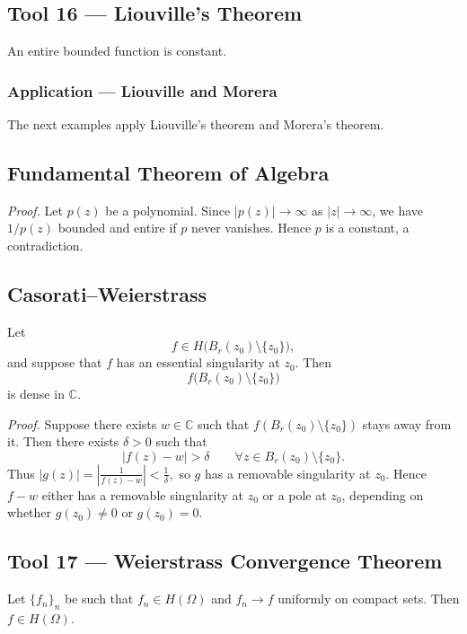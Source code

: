 \documentclass[11pt,a4paper]{article}
\begin{document}

\subsection*{Tool 16 — Liouville's Theorem}
An entire bounded function is constant.


\subsubsection*{Application — Liouville and Morera}
The next examples apply Liouville's theorem and Morera's theorem.

\subsection*{Fundamental Theorem of Algebra}

\textit{Proof.}
Let $p(z)$ be a polynomial. Since $|p(z)|\to\infty$ as $|z|\to\infty$, we
have $1/p(z)$ bounded and entire if $p$ never vanishes. Hence $p$ is a
constant, a contradiction.

\subsection*{Casorati--Weierstrass}
Let
\[
  f\in H\bigl(B_r(z_0)\setminus\{z_0\}\bigr),
\]
and suppose that $f$ has an essential singularity at $z_0$. Then
\[
  f\bigl(B_r(z_0)\setminus\{z_0\}\bigr)
\]
is dense in $\mathbb C$.


\textit{Proof.}
Suppose there exists $w\in\mathbb C$ such that
$f(B_r(z_0)\setminus\{z_0\})$ stays away from it. Then there exists
$\delta>0$ such that
\[
  |f(z)-w|>\delta
  \qquad\forall z\in B_r(z_0)\setminus\{z_0\}.
\]
Thus \(|g(z)|=\left|\frac1{f(z)-w}\right|<\frac1\delta,\)
so $g$ has a removable singularity at $z_0$. Hence $f-w$ either has a
removable singularity at $z_0$ or a pole at $z_0$, depending on whether
$g(z_0)\neq0$ or $g(z_0)=0$.

\subsection*{Tool 17 — Weierstrass Convergence Theorem}
Let $\{f_n\}_n$ be such that $f_n\in H(\Omega)$ and $f_n\to f$ uniformly on
compact sets. Then $f\in H(\Omega)$.
\end{document}
